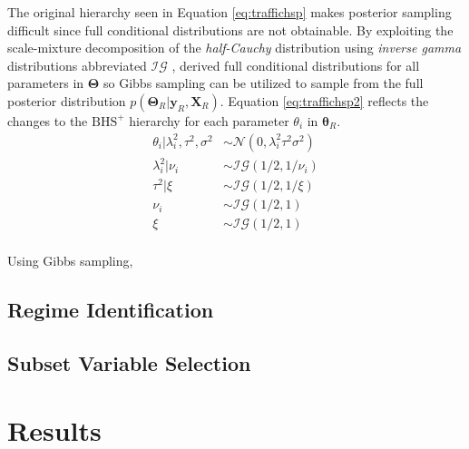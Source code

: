 The original hierarchy seen in Equation \ref{eq:traffichsp} makes posterior sampling difficult since full conditional distributions are not obtainable. By exploiting the scale-mixture decomposition of the \textit{half-Cauchy} distribution using \textit{inverse gamma} distributions abbreviated $\mathcal{IG}$ \citep{Wand2011}, \cite{Makalic2016b} derived full conditional distributions for all parameters in $\bm{\Theta}$ so Gibbs sampling \citep{Geman1987,Gelfand1990} can be utilized to sample from the full posterior distribution $p(\bm{\Theta}_R|\bm{y}_R,\bm{X}_R)$. Equation \ref{eq:traffichsp2} reflects the changes to the $\textrm{BHS}^+$ hierarchy for each parameter $\theta_i$ in $\bm{\theta}_R$.
\begin{equation}
\label{eq:traffichsp2}
\begin{split}
\theta_i|\lambda_i^2,\tau^2,\sigma^2 & \sim \mathcal{N}(0,\lambda_i^2\tau^2\sigma^2) \\
\lambda^2_i|\nu_i & \sim \mathcal{IG}(1/2,1/\nu_i)\\
\tau^2|\xi & \sim \mathcal{IG}(1/2,1/\xi)\\
\nu_i & \sim \mathcal{IG}(1/2,1) \\
\xi & \sim \mathcal{IG}(1/2,1) \\
\end{split}
\end{equation}

Using Gibbs sampling, 

\subsection{Regime Identification}
\label{sec:stage2}



\subsection{Subset Variable Selection}
\label{sec:stage3}











\section{Results}

